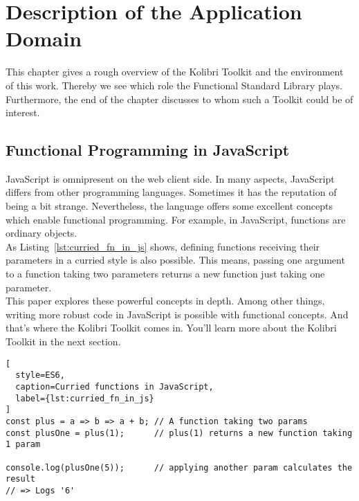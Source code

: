 \section{Description of the Application Domain}
\label{Description of the Application Domain}
This chapter gives a rough overview of the Kolibri Toolkit and the environment
of this work. Thereby we see which role the Functional Standard Library plays.
Furthermore, the end of the chapter discusses to whom such a Toolkit could be of interest.

\subsection{Functional Programming in JavaScript}
\label{sub:Functional Programming in JavaScript}
JavaScript is omnipresent on the web client side. In many aspects, JavaScript
differs from other programming languages. Sometimes it has the reputation of
being a bit strange. Nevertheless, the language offers some excellent concepts
which enable functional programming. For example, in JavaScript, functions are
ordinary objects. \\
As Listing~\ref{lst:curried_fn_in_js} shows, defining functions receiving their
parameters in a curried style is also possible. This means, passing one
argument to a function taking two parameters returns a new function just taking
one parameter. \\ 
This paper explores these powerful concepts in depth. Among other things,
writing more robust code in JavaScript is possible with functional concepts.
And that’s where the Kolibri Toolkit comes in. You’ll learn more about the
Kolibri Toolkit in the next section.

\begin{lstlisting}[
  style=ES6,
  caption=Curried functions in JavaScript,
  label={lst:curried_fn_in_js}
]
const plus = a => b => a + b; // A function taking two params
const plusOne = plus(1);      // plus(1) returns a new function taking 1 param

console.log(plusOne(5));      // applying another param calculates the result
// => Logs '6'
\end{lstlisting}


